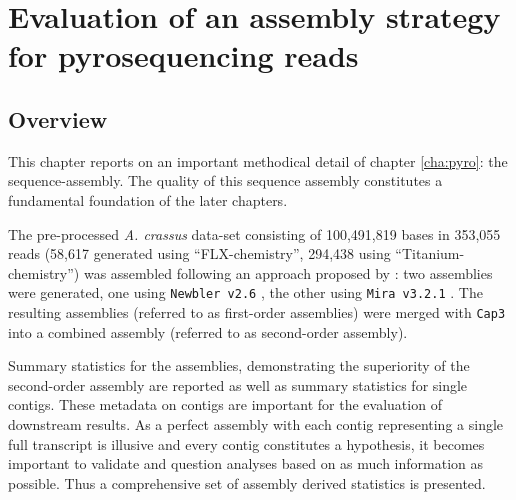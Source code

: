 
\chapter{Evaluation of an assembly strategy for pyrosequencing
  reads} %
\label{chap:eval-ass}


\ifpdf
    \graphicspath{{4_eval_ass/figures/PNG/}{4_eval_ass/figures/PDF/}{4_eval_ass/figures/}}
\else
    \graphicspath{{4_eval_ass/figures/EPS/}{4_eval_ass/figures/}}
\fi



\section{Overview}
\label{sec:over-eval}

This chapter reports on an important methodical detail of chapter
\ref{cha:pyro}: the sequence-assembly. The quality of this sequence
assembly constitutes a fundamental foundation of the later chapters.

The pre-processed \textit{A. crassus} data-set consisting of
100,491,819 bases in 353,055 reads (58,617 generated using
``FLX-chemistry'', 294,438 using ``Titanium-chemistry'') was assembled
following an approach proposed by \cite{pmid20950480}: two assemblies
were generated, one using \texttt{Newbler v2.6} \cite{pmid16056220},
the other using \texttt{Mira v3.2.1} \cite{miraEST}. The resulting
assemblies (referred to as first-order assemblies) were merged with
\texttt{Cap3} \cite{Cap3_Huang} into a combined assembly (referred to
as second-order assembly).

Summary statistics for the assemblies, demonstrating the superiority
of the second-order assembly are reported as well as summary
statistics for single contigs. These metadata on contigs are important
for the evaluation of downstream results. As a perfect assembly with
each contig representing a single full transcript is illusive and
every contig constitutes a hypothesis, it becomes important to
validate and question analyses based on as much information as
possible. Thus a comprehensive set of assembly derived statistics is
presented.

